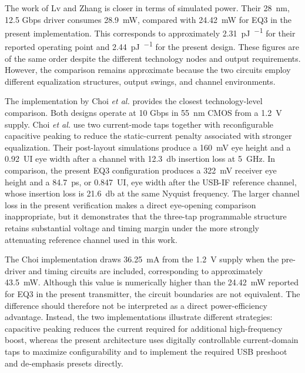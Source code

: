 The work of Lv and Zhang \cite{lv_cml_28nm_2018} is closer in terms of simulated power. Their \SI{28}{\nano\meter}, 12.5 Gbps driver consumes \SI{28.9}{\milli\watt}, compared with \SI{24.42}{\milli\watt} for EQ3 in the present implementation. This corresponds to approximately \SI{2.31}{\pico\joule\per\bit} for their reported operating point and \SI{2.44}{\pico\joule\per\bit} for the present design. These figures are of the same order despite the different technology nodes and output requirements. However, the comparison remains approximate because the two circuits employ different equalization structures, output swings, and channel environments.

The implementation by Choi \textit{et al.} \cite{choi2019} provides the closest technology-level comparison. Both designs operate at 10 Gbps in \SI{55}{\nano\meter} \ac{CMOS} from a \SI{1.2}{\volt} supply. Choi \textit{et al.} use two current-mode taps together with reconfigurable capacitive peaking to reduce the static-current penalty associated with stronger equalization. Their post-layout simulations produce a \SI{160}{\milli\volt} eye height and a 0.92~UI eye width after a channel with \SI{12.3}{\decibel} insertion loss at \SI{5}{\giga\hertz}. In comparison, the present EQ3 configuration produces a \SI{322}{\milli\volt} receiver eye height and a \SI{84.7}{\pico\second}, or 0.847~UI, eye width after the \ac{USB-IF} reference channel, whose insertion loss is \SI{21.6}{\decibel} at the same Nyquist frequency. The larger channel loss in the present verification makes a direct eye-opening comparison inappropriate, but it demonstrates that the three-tap programmable structure retains substantial voltage and timing margin under the more strongly attenuating reference channel used in this work.

The Choi implementation draws \SI{36.25}{\milli\ampere} from the \SI{1.2}{\volt} supply when the pre-driver and timing circuits are included, corresponding to approximately \SI{43.5}{\milli\watt}. Although this value is numerically higher than the \SI{24.42}{\milli\watt} reported for EQ3 in the present transmitter, the circuit boundaries are not equivalent. The difference should therefore not be interpreted as a direct power-efficiency advantage. Instead, the two implementations illustrate different strategies: capacitive peaking reduces the current required for additional high-frequency boost, whereas the present architecture uses digitally controllable current-domain taps to maximize configurability and to implement the required \ac{USB} preshoot and de-emphasis presets directly.


